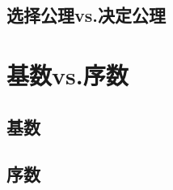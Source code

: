 \begin{axiom}[无穷公理]
    
\end{axiom}
\begin{axiom}[幂集公理]
    
\end{axiom}
\begin{axiom}[外延公理]
    
\end{axiom}
\begin{axiom}[替代公理模式]
    
\end{axiom}
\begin{axiom}[分离公理模式]
    
\end{axiom}
\begin{axiom}[正则公理]
    
\end{axiom}
\begin{axiom}[并集公理]
    
\end{axiom}
\begin{axiom}[配对公理]
    
\end{axiom}


\subsection{选择公理vs.决定公理}\label{选择公理和决定公理}

\begin{axiom}[选择公理]
    
\end{axiom}
\begin{axiom}[决定公理]
    
\end{axiom}

\section{基数vs.序数}

\subsection{基数}\label{基数}



\begin{postulate}[连续统假设]
    
\end{postulate}


\subsection{序数}
\begin{definition}[序数]
    
\end{definition}







